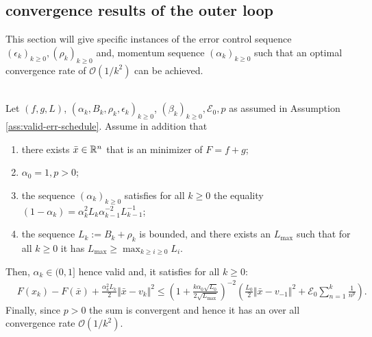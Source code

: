 \documentclass[12pt]{article}
\begin{document}
    \subsection{convergence results of the outer loop}
        This section will give specific instances of the error control sequence $(\epsilon_k)_{k \ge 0}, (\rho_k)_{k \ge0}$ and, momentum sequence $(\alpha_k)_{k \ge0}$ such that an optimal convergence rate of $\mathcal O(1/k^2)$ can be achieved. 
        \begin{proposition}\;\label{prop:opt-cnvg-outr-loop}\\
            Let $(f, g, L)$, $(\alpha_k, B_k, \rho_k, \epsilon_k)_{k \ge 0}$, $(\beta_k)_{k\ge 0}, \mathcal E_0, p$ as assumed in Assumption \ref{ass:valid-err-schedule}. 
            Assume in addition that
            \begin{enumerate}[nosep]
                \item there exists $\bar x \in \mathbb R^n$ that is an minimizer of $F = f + g$;
                \item $\alpha_0 = 1, p > 0$; 
                \item the sequence $(\alpha_k)_{k\ge 0}$ satisfies for all $k \ge 0$ the equality $(1 - \alpha_k) = \alpha_{k}^2L_k\alpha_{k - 1}^{-2}L_{k - 1}^{-1}$;
                \item the sequence $L_k := B_k + \rho_k$ is bounded, and there exists an $L_{\max}$ such that for all $k \ge 0$ it has $L_{\max} \ge \max_{k\ge i\ge 0} L_i$. 
            \end{enumerate}
            Then, $\alpha_k \in (0, 1]$ hence valid and, it satisfies for all $k \ge 0$: 
            \begin{align*}
                & F(x_k) - F(\bar x) + \frac{\alpha_k^2L_k}{2}\Vert \bar x - v_k\Vert^2
                \le 
                \left(
                    1 + \frac{k\alpha_0\sqrt{L_0}}{2\sqrt{L_{\max}}}
                \right)^{-2}\left(
                    \frac{L_0}{2}\Vert \bar x - v_{-1}\Vert^2
                    + \mathcal E_0 \sum_{n = 1}^{k} \frac{1}{n^p}
                \right). 
            \end{align*}
            Finally, since $p > 0$ the sum is convergent and hence it has an over all convergence rate $\mathcal O(1/k^2)$. 
        \end{proposition}
\end{document}
